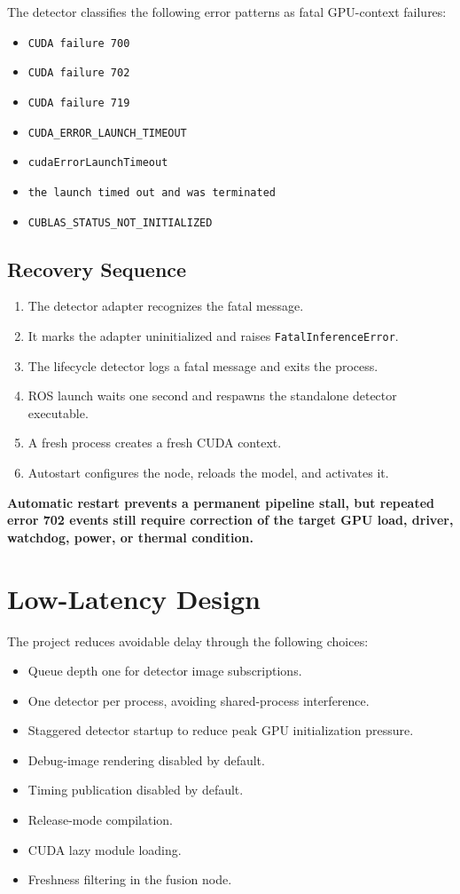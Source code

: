 \documentclass[11pt,a4paper]{article}
\newcommand{\important}[1]{\textbf{\color{warning}#1}}
\begin{document}
The detector classifies the following error patterns as fatal GPU-context failures:

\begin{itemize}
  \item \texttt{CUDA failure 700}
  \item \texttt{CUDA failure 702}
  \item \texttt{CUDA failure 719}
  \item \texttt{CUDA\_ERROR\_LAUNCH\_TIMEOUT}
  \item \texttt{cudaErrorLaunchTimeout}
  \item \texttt{the launch timed out and was terminated}
  \item \texttt{CUBLAS\_STATUS\_NOT\_INITIALIZED}
\end{itemize}

\subsection{Recovery Sequence}

\begin{enumerate}
  \item The detector adapter recognizes the fatal message.
  \item It marks the adapter uninitialized and raises \texttt{FatalInferenceError}.
  \item The lifecycle detector logs a fatal message and exits the process.
  \item ROS launch waits one second and respawns the standalone detector executable.
  \item A fresh process creates a fresh CUDA context.
  \item Autostart configures the node, reloads the model, and activates it.
\end{enumerate}

\important{Automatic restart prevents a permanent pipeline stall, but repeated error 702 events still require correction of the target GPU load, driver, watchdog, power, or thermal condition.}

\section{Low-Latency Design}

The project reduces avoidable delay through the following choices:

\begin{itemize}
  \item Queue depth one for detector image subscriptions.
  \item One detector per process, avoiding shared-process interference.
  \item Staggered detector startup to reduce peak GPU initialization pressure.
  \item Debug-image rendering disabled by default.
  \item Timing publication disabled by default.
  \item Release-mode compilation.
  \item CUDA lazy module loading.
  \item Freshness filtering in the fusion node.
\end{itemize}
\end{document}
